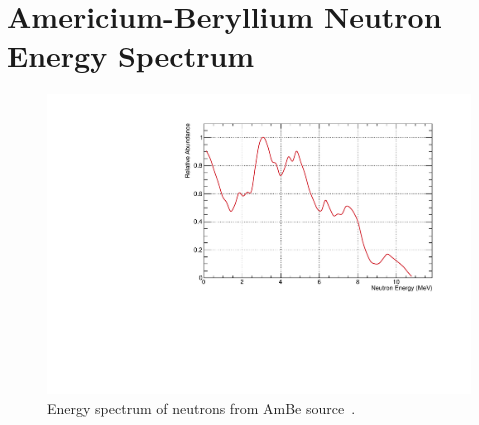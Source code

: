 \chapter{Americium-Beryllium Neutron Energy Spectrum}
\label{chap:AmBeSpec}

\begin{figure}[htb]
	\centerfloat
		\includegraphics[scale=0.6]{images/AmBe_NeutronSpectrum.pdf}
	\caption[Energy spectrum of neutrons from AmBe source]{Energy spectrum of neutrons from AmBe source~\cite{AmBeSpec}.}
	\label{fig:AmBeSpec}
\end{figure}
